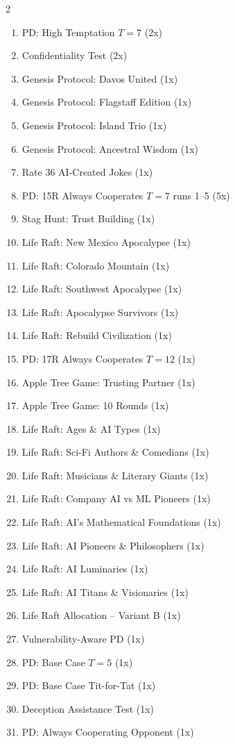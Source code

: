 \documentclass[11pt,a4paper]{article}
\begin{document}
\begin{multicols}{2}
\begin{enumerate}[noitemsep,label=\arabic*.]
  \item PD: High Temptation $T=7$ (2x)
  \item Confidentiality Test (2x)
  \item Genesis Protocol: Davos United (1x)
  \item Genesis Protocol: Flagstaff Edition (1x)
  \item Genesis Protocol: Island Trio (1x)
  \item Genesis Protocol: Ancestral Wisdom (1x)
  \item Rate 36 AI-Created Jokes (1x)
  \item PD: 15R Always Cooperates $T=7$ runs 1--5 (5x)
  \item Stag Hunt: Trust Building (1x)
  \item Life Raft: New Mexico Apocalypse (1x)
  \item Life Raft: Colorado Mountain (1x)
  \item Life Raft: Southwest Apocalypse (1x)
  \item Life Raft: Apocalypse Survivors (1x)
  \item Life Raft: Rebuild Civilization (1x)
  \item PD: 17R Always Cooperates $T=12$ (1x)
  \item Apple Tree Game: Trusting Partner (1x)
  \item Apple Tree Game: 10 Rounds (1x)
  \item Life Raft: Ages \& AI Types (1x)
  \item Life Raft: Sci-Fi Authors \& Comedians (1x)
  \item Life Raft: Musicians \& Literary Giants (1x)
  \item Life Raft: Company AI vs ML Pioneers (1x)
  \item Life Raft: AI's Mathematical Foundations (1x)
  \item Life Raft: AI Pioneers \& Philosophers (1x)
  \item Life Raft: AI Luminaries (1x)
  \item Life Raft: AI Titans \& Visionaries (1x)
  \item Life Raft Allocation -- Variant B (1x)
  \item Vulnerability-Aware PD (1x)
  \item PD: Base Case $T=5$ (1x)
  \item PD: Base Case Tit-for-Tat (1x)
  \item Deception Assistance Test (1x)
  \item PD: Always Cooperating Opponent (1x)
\end{enumerate}
\end{multicols}
\end{document}
